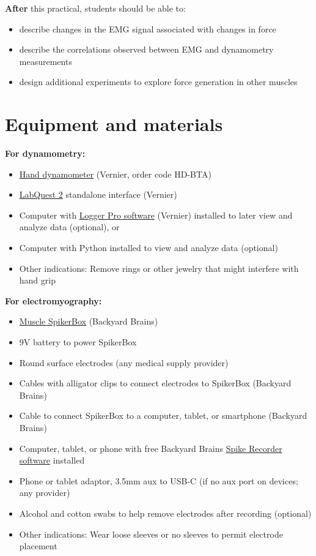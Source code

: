 \documentclass{article}
\begin{document}
\textbf{After} this practical, students should be able to:

\begin{itemize}
\item describe changes in the EMG signal associated with changes in force
\item describe the correlations observed between EMG and dynamometry measurements
\item design additional experiments to explore force generation in other muscles
\end{itemize}

\section{Equipment and materials}

\textbf{For dynamometry:}

\begin{itemize}
\item \href{https://www.vernier.com/product/hand-dynamometer/}{Hand dynamometer} (Vernier, order code HD-BTA)
\item \href{https://www.vernier.com/product/labquest-2/}{LabQuest 2} standalone interface (Vernier)
\item Computer with \href{https://www.vernier.com/product/logger-pro-3/}{Logger Pro software} (Vernier) installed to later view and analyze data (optional), or
\item Computer with Python installed to view and analyze data (optional)
\item Other indications: Remove rings or other jewelry that might interfere with hand grip
\end{itemize}

\textbf{For electromyography:}

\begin{itemize}
\item \href{https://backyardbrains.com/products/muscle-spikerbox}{Muscle SpikerBox} (Backyard Brains)
\item 9V battery to power SpikerBox
\item Round surface electrodes (any medical supply provider)
\item Cables with alligator clips to connect electrodes to SpikerBox (Backyard Brains)
\item Cable to connect SpikerBox to a computer, tablet, or smartphone (Backyard Brains)
\item Computer, tablet, or phone with free Backyard Brains \href{https://backyardbrains.com/products/byb-spike-recorder}{Spike Recorder software} installed
\item Phone or tablet adaptor, 3.5mm aux to USB-C (if no aux port on devices; any provider)
\item Alcohol and cotton swabs to help remove electrodes after recording (optional)
\item Other indications: Wear loose sleeves or no sleeves to permit electrode placement
\end{itemize}
\end{document}
